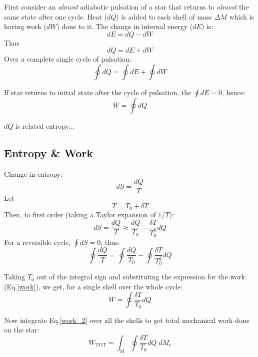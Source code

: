\documentclass{spy}
\begin{document}
First consider an \textit{almost} adiabatic pulsation of a star that returns to \textit{almost} the same state after one cycle. Heat (\(dQ\)) is added to each shell of mass \(\Delta M\) which is having work (\(dW\)) done to it. The change in internal energy (\(dE\)) is:
\begin{equation}
     dE = dQ - dW
\end{equation}
Thus
\begin{equation}
     dQ = dE + dW
\end{equation}
Over a complete single cycle of pulsation:
\begin{equation}
    \oint dQ = \oint dE + \oint dW
\end{equation}

If star returns to initial state after the cycle of pulsation, the \(\oint dE = 0\), hence:
\begin{equation}
    W = \oint dQ
    \label{work}
\end{equation}

\(dQ\) is related entropy...


\subsection{Entropy \& Work}
Change in entropy:
\begin{equation}
    dS = \frac{dQ}{T}
\end{equation}
Let
\begin{equation}
    T = T_\mathrm{0} + \delta T
\end{equation}
Then, to first order (taking a Taylor expansion of \(1/T\)):
\begin{equation}
    dS = \frac{dQ}{T} \approx \frac{dQ}{T_\mathrm{0}} - \frac{\delta T}{T^2_\mathrm{0}} dQ
\end{equation}
For a reversible cycle, \(\oint dS = 0\), thus:
\begin{equation}
    \oint \frac{dQ}{T} = \oint \frac{dQ}{T_\mathrm{0}} - \oint \frac{\delta T}{T^2_\mathrm{0}} dQ
\end{equation}

Taking \(T_\mathrm{0}\) out of the integral sign and substituting the expression for the work (Eq.\ref{work}), we get, for a single shell over the whole cycle:
\begin{equation}
    W = \oint \frac{\delta T}{T_\mathrm{0}} dQ
    \label{work_2}
\end{equation}

Now integrate Eq.\ref{work_2} over all the shells to get total mechanical work done on the star:
\begin{equation}
    W_\mathrm{TOT} = \int_\mathrm{M} \oint \frac{\delta T}{T_\mathrm{0}} dQ \; dM_\mathrm{r}
\end{equation}
\end{document}
